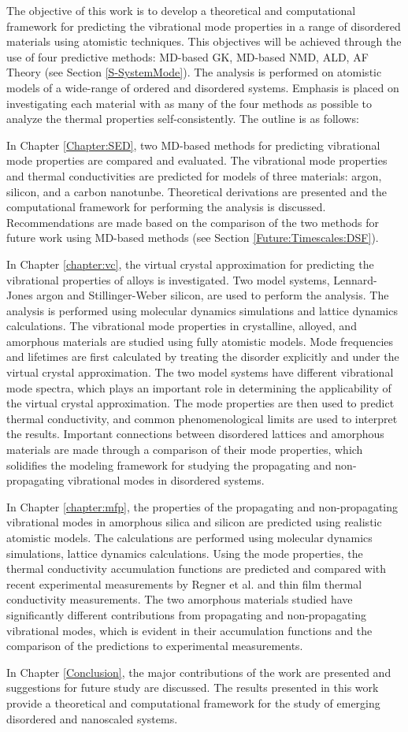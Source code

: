 The objective of this work is to develop a theoretical and computational 
framework for predicting the vibrational mode properties in a range 
of disordered materials using atomistic techniques. 
This objectives will be achieved through the use of four predictive 
methods: MD-based GK, MD-based NMD, ALD, AF Theory 
(see Section \ref{S-SystemMode}). 
The analysis is performed on atomistic models of a wide-range of 
ordered and disordered systems. Emphasis is placed on investigating each 
material with as many of the four methods as possible to 
analyze the thermal properties self-consistently. 
The outline is as follows:

In Chapter \ref{Chapter:SED}, two MD-based methods for predicting 
vibrational mode properties are compared and evaluated. The vibrational 
mode properties and thermal conductivities are predicted for 
models of three materials: argon, silicon, and 
a carbon nanotunbe. Theoretical derivations are presented 
and the computational framework for performing the analysis is discussed. 
Recommendations are made based on the comparison of the two methods 
for future work using MD-based methods 
(see Section \ref{Future:Timescales:DSF}).

In Chapter \ref{chapter:vc}, the virtual crystal approximation for 
predicting the vibrational properties of alloys is investigated. 
Two model systems, Lennard-Jones argon and Stillinger-Weber
silicon, are used to perform the analysis. 
The analysis is performed 
using molecular dynamics simulations and lattice
dynamics calculations. 
The vibrational mode properties in crystalline, 
alloyed, and amorphous materials are studied 
using fully atomistic models. 
Mode frequencies and lifetimes are first 
calculated by treating the disorder explicitly and under the 
virtual crystal approximation. The two model systems 
have different vibrational mode spectra, which plays an important role in 
determining the applicability of the virtual crystal approximation. 
The mode properties are then used to predict thermal conductivity, and 
common phenomenological limits are used to interpret the results. Important 
connections between disordered lattices and amorphous materials are made 
through a comparison of their mode properties, which solidifies 
the modeling framework for studying the propagating and non-propagating 
vibrational modes in disordered systems. 

In Chapter \ref{chapter:mfp}, the properties of the propagating and 
non-propagating vibrational modes in amorphous silica and silicon 
are predicted using realistic atomistic models.   
The calculations are performed using molecular dynamics simulations, 
lattice dynamics calculations. 
Using the mode properties, 
the thermal conductivity accumulation functions are predicted and compared 
with recent experimental measurements by 
Regner et al.\cite{regner_broadband_2013} and thin film 
thermal conductivity measurements.  The two amorphous materials studied 
have significantly different contributions from propagating and 
non-propagating vibrational modes, which is evident in their 
accumulation functions and the comparison of the predictions 
to experimental measurements.

In Chapter \ref{Conclusion}, the major contributions of the work are
presented and suggestions for future study are discussed. 
The results presented in this work provide a theoretical and 
computational framework for the study of emerging disordered 
and nanoscaled systems. 

